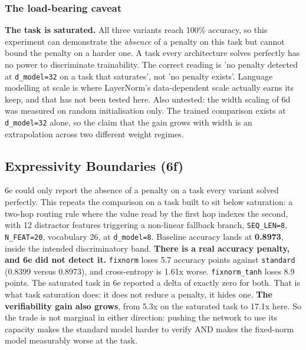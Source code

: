 \documentclass[10pt,journal]{IEEEtran}
\begin{document}
\subsubsection*{The load-bearing caveat}
\textbf{The task is saturated.} All three variants reach 100\% accuracy, so this experiment can demonstrate the \emph{absence} of a penalty on this task but cannot bound the penalty on a harder one. A task every architecture solves perfectly has no power to discriminate trainability. The correct reading is 'no penalty detected at \texttt{d\_model=32} on a task that saturates', not 'no penalty exists'. Language modelling at scale is where LayerNorm's data-dependent scale actually earns its keep, and that has not been tested here.
Also untested: the width scaling of 6d was measured on random initialisation only. The trained comparison exists at \texttt{d\_model=32} alone, so the claim that the gain grows with width is an extrapolation across two different weight regimes.
\subsection{Expressivity Boundaries (6f)}
6e could only report the absence of a penalty on a task every variant solved perfectly. This repeats the comparison on a task built to sit below saturation: a two-hop routing rule where the value read by the first hop indexes the second, with 12 distractor features triggering a non-linear fallback branch, \texttt{SEQ\_LEN=8}, \texttt{N\_FEAT=20}, vocabulary 26, at \texttt{d\_model=8}. Baseline accuracy lands at \textbf{0.8973}, inside the intended discriminatory band.
\textbf{There is a real accuracy penalty, and 6e did not detect it.} \texttt{fixnorm} loses 5.7 accuracy points against \texttt{standard} (0.8399 versus 0.8973), and cross-entropy is 1.61x worse. \texttt{fixnorm\_tanh} loses 8.9 points. The saturated task in 6e reported a delta of exactly zero for both. That is what task saturation does: it does not reduce a penalty, it hides one.
\textbf{The verifiability gain also grows}, from 5.3x on the saturated task to 17.1x here. So the trade is not marginal in either direction: pushing the network to use its capacity makes the standard model harder to verify AND makes the fixed-norm model measurably worse at the task.
\end{document}
